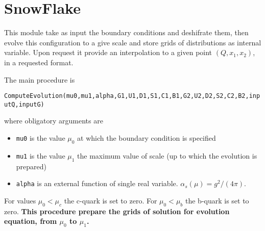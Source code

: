 \documentclass[prd,nofootinbib,eqsecnum,final]{revtex4}
\renewcommand{\(}{\left(}
\renewcommand{\)}{\right)}
\renewcommand{\[}{\left[}
\renewcommand{\]}{\right]}
\begin{document}
\section{SnowFlake}

This module take as input the boundary conditions and deshifrate them, then evolve this configuration to a give scale and store grids of distributions as internal variable. Upon request it provide an interpolation to a given point $(Q,x_1,x_2)$, in a requested format.

The main procedure is 
\begin{center}
\texttt{ComputeEvolution(mu0,mu1,alpha,G1,U1,D1,S1,C1,B1,G2,U2,D2,S2,C2,B2,inputQ,inputG)}
\end{center}
where obligatory arguments are
\begin{itemize}
\item \texttt{mu0} is the value $\mu_0$ at which the boundary condition is specified
\item \texttt{mu1} is the value $\mu_1$ the maximum value of scale (up to which the evolution is prepared)
\item \texttt{alpha} is an external function of single real variable. $\alpha_s(\mu)=g^2/(4\pi)$.
\end{itemize}
For values $\mu_0<\mu_c$ the c-quark is set to zero. For $\mu_0<\mu_b$ the b-quark is set to zero. \textbf{This procedure prepare the grids of solution for evolution equation, from $\mu_0$ to $\mu_1$.}
\end{document}
